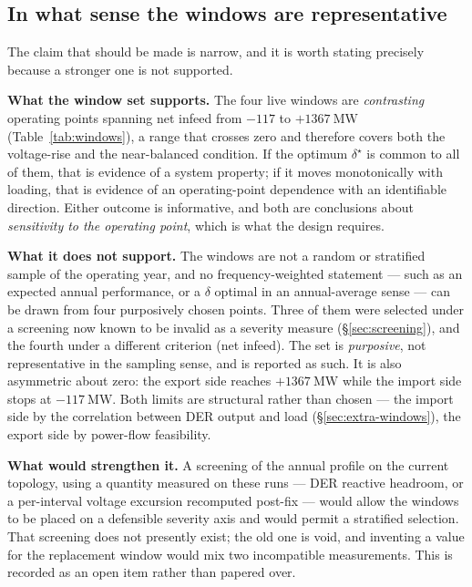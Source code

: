 \documentclass[11pt,a4paper]{article}
\newcommand{\dz}{\ensuremath{\delta}}
\begin{document}
\subsection{In what sense the windows are representative}
\label{sec:representative}

The claim that should be made is narrow, and it is worth stating precisely
because a stronger one is not supported.

\textbf{What the window set supports.} The four live windows are
\emph{contrasting} operating points spanning net infeed from
$-117$ to $+\SI{1367}{\mega\watt}$ (Table~\ref{tab:windows}), a range that
crosses zero and therefore covers both the voltage-rise and the near-balanced
condition. If the optimum $\dz^\star$ is common to all of them, that is evidence
of a system property; if it moves monotonically with loading, that is evidence
of an operating-point dependence with an identifiable direction. Either outcome
is informative, and both are conclusions about \emph{sensitivity to the
operating point}, which is what the design requires.

\textbf{What it does not support.} The windows are not a random or stratified
sample of the operating year, and no frequency-weighted statement --- such as an
expected annual performance, or a $\dz$ optimal in an annual-average sense ---
can be drawn from four purposively chosen points. Three of them were selected
under a screening now known to be invalid as a severity measure
(\S\ref{sec:screening}), and the fourth under a different criterion (net
infeed). The set is \emph{purposive}, not representative in the sampling sense,
and is reported as such. It is also asymmetric about zero: the export side
reaches $+\SI{1367}{\mega\watt}$ while the import side stops at
$-\SI{117}{\mega\watt}$. Both limits are structural rather than chosen --- the
import side by the correlation between DER output and load
(\S\ref{sec:extra-windows}), the export side by power-flow feasibility.

\textbf{What would strengthen it.} A screening of the annual profile on the
current topology, using a quantity measured on these runs --- DER reactive
headroom, or a per-interval voltage excursion recomputed post-fix --- would
allow the windows to be placed on a defensible severity axis and would permit a
stratified selection. That screening does not presently exist; the old one is
void, and inventing a value for the replacement window would mix two
incompatible measurements. This is recorded as an open item rather than
papered over.
\end{document}
